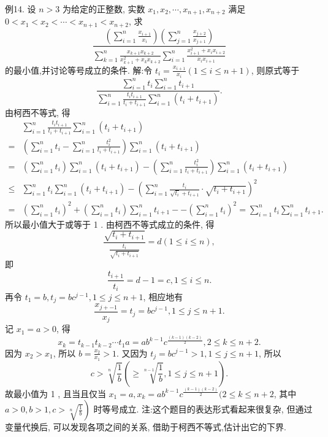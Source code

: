 例14. 设 $n>3$ 为给定的正整数, 实数 $x_1, x_2, \cdots, x_{n+1}, x_{n+2}$ 满足 $0< x_1<x_2<\cdots<x_{n+1}<x_{n+2}$, 求
$$
\frac{\left(\sum_{i=1}^n \frac{x_{i+1}}{x_i}\right)\left(\sum_{j=1}^n \frac{x_{j+2}}{x_{j+1}}\right)}{\sum_{k=1}^n \frac{x_{k+1} x_{k+2}}{x_{k+1}^2+x_k x_{k+2}} \sum_{i=1}^n \frac{x_{i+1}^2+x_i x_{i+2}}{x_i x_{i+1}}}
$$
的最小值,并讨论等号成立的条件.
解:令 $t_i=\frac{x_{i+1}}{x_i}(1 \leqslant i \leqslant n+1)$, 则原式等于
$$
\frac{\sum_{i=1}^n t_i \sum_{i=1}^n t_{i+1}}{\sum_{i=1}^n \frac{t_i t_{i+1}}{t_i+t_{i+1}} \sum_{i=1}^n\left(t_i+t_{i+1}\right)} .
$$
由柯西不等式, 得
$$
\begin{aligned}
& \sum_{i=1}^n \frac{t_i t_{i+1}}{t_i+t_{i+1}} \sum_{i=1}^n\left(t_i+t_{i+1}\right) \\
= & \left(\sum_{i=1}^n t_i-\sum_{i=1}^n \frac{t_i^2}{t_i+t_{i+1}}\right) \sum_{i=1}^n\left(t_i+t_{i+1}\right) \\
= & \left(\sum_{i=1}^n t_i\right) \sum_{i=1}^n\left(t_i+t_{i+1}\right)-\left(\sum_{i=1}^n \frac{t_i^2}{t_i+t_{i+1}}\right) \sum_{i=1}^n\left(t_i+t_{i+1}\right) \\
\leqslant & \sum_{i=1}^n t_i \sum_{i=1}^n\left(t_i+t_{i+1}\right)-\left(\sum_{i=1}^n \frac{t_i}{\sqrt{t_i}+t_{i+1}} \cdot \sqrt{t_i+t_{i+1}}\right)^2 \\
= & \left(\sum_{i=1}^n t_i\right)^2+\left(\sum_{i=1}^n t_i\right) \sum_{i=1}^n t_{i+1}--\left(\sum_{i=1}^n t_i\right)^2=\sum_{i=1}^n t_i \sum_{i=1}^n t_{i+1} .
\end{aligned}
$$
所以最小值大于或等于 1 .
由柯西不等式成立的条件, 得
$$
\frac{\sqrt{t_i+t_{i+1}}}{\frac{t_i}{\sqrt{t_i+t_{i+1}}}}=d(1 \leqslant i \leqslant n),
$$
即
$$
\frac{t_{i+1}}{t_i}=d-1=c, 1 \leqslant i \leqslant n .
$$
再令 $t_1=b, t_j=b c^{j-1}, 1 \leqslant j \leqslant n+1$, 相应地有
$$
\frac{x_{j+-1}}{x_j}=t_j=b c^{j-1}, 1 \leqslant j \leqslant n+1 .
$$
记 $x_1=a>0$, 得
$$
x_k=t_{k-1} t_{k-2} \cdots t_1 a=a b^{k-1} c^{\frac{(k-1)(k-2)}{2}}, 2 \leqslant k \leqslant n+2 .
$$
因为 $x_2>x_1$, 所以 $b=\frac{x_2}{x_1}>1$.
又因为 $t_j=b c^{j-1}>1,1 \leqslant j \leqslant n+1$, 所以
$$
c>\sqrt[n]{\frac{1}{b}}\left(\geqslant \sqrt[n-1]{\frac{1}{b}}, 1 \leqslant j \leqslant n+1\right) .
$$
故最小值为 1 , 且当且仅当 $x_1=a, x_k=a b^{k-1} c^{\frac{(k-1)(k-2)}{2}}(2 \leqslant k \leqslant n+2$, 其中 $\left.a>0, b>1, c>\sqrt[n]{\frac{1}{b}}\right)$ 时等号成立.
注:这个题目的表达形式看起来很复杂, 但通过变量代换后, 可以发现各项之间的关系, 借助于柯西不等式,估计出它的下界.


